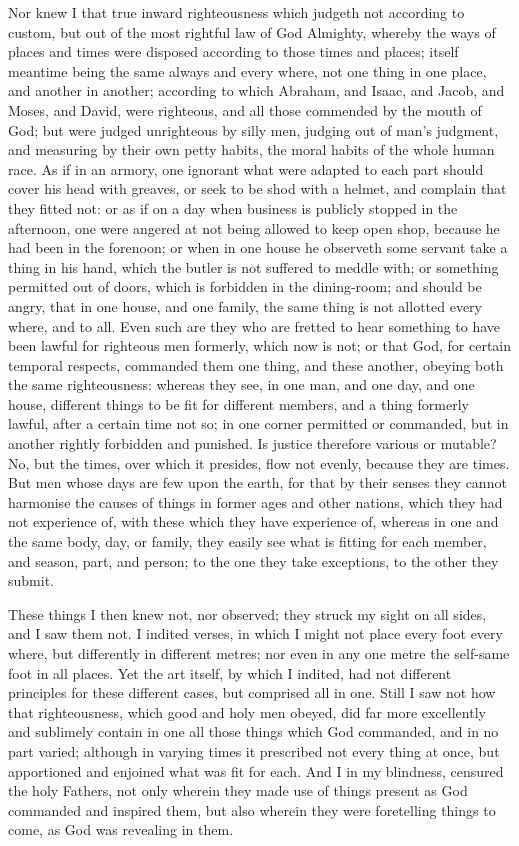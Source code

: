 \documentclass[b5paper,openright,12pt,twoside]{book}
\begin{document}
Nor knew I that true inward righteousness which judgeth not according
to custom, but out of the most rightful law of God Almighty, whereby
the ways of places and times were disposed according to those times and
places; itself meantime being the same always and every where, not one
thing in one place, and another in another; according to which Abraham,
and Isaac, and Jacob, and Moses, and David, were righteous, and all
those commended by the mouth of God; but were judged unrighteous by
silly men, judging out of man's judgment, and measuring by their own
petty habits, the moral habits of the whole human race. As if in an
armory, one ignorant what were adapted to each part should cover his
head with greaves, or seek to be shod with a helmet, and complain that
they fitted not: or as if on a day when business is publicly stopped in
the afternoon, one were angered at not being allowed to keep open shop,
because he had been in the forenoon; or when in one house he observeth
some servant take a thing in his hand, which the butler is not suffered
to meddle with; or something permitted out of doors, which is forbidden
in the dining-room; and should be angry, that in one house, and one
family, the same thing is not allotted every where, and to all. Even
such are they who are fretted to hear something to have been lawful
for righteous men formerly, which now is not; or that God, for certain
temporal respects, commanded them one thing, and these another, obeying
both the same righteousness: whereas they see, in one man, and one day,
and one house, different things to be fit for different members, and
a thing formerly lawful, after a certain time not so; in one corner
permitted or commanded, but in another rightly forbidden and punished.
Is justice therefore various or mutable? No, but the times, over which
it presides, flow not evenly, because they are times. But men whose days
are few upon the earth, for that by their senses they cannot harmonise
the causes of things in former ages and other nations, which they had
not experience of, with these which they have experience of, whereas in
one and the same body, day, or family, they easily see what is fitting
for each member, and season, part, and person; to the one they take
exceptions, to the other they submit.

These things I then knew not, nor observed; they struck my sight on all
sides, and I saw them not. I indited verses, in which I might not place
every foot every where, but differently in different metres; nor even in
any one metre the self-same foot in all places. Yet the art itself, by
which I indited, had not different principles for these different cases,
but comprised all in one. Still I saw not how that righteousness, which
good and holy men obeyed, did far more excellently and sublimely contain
in one all those things which God commanded, and in no part varied;
although in varying times it prescribed not every thing at once, but
apportioned and enjoined what was fit for each. And I in my blindness,
censured the holy Fathers, not only wherein they made use of things
present as God commanded and inspired them, but also wherein they were
foretelling things to come, as God was revealing in them.
\end{document}

